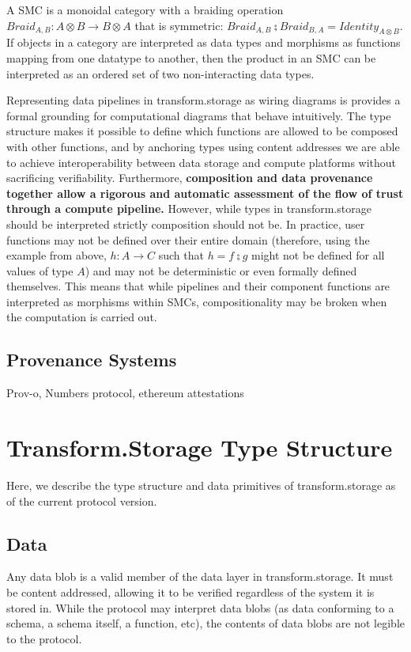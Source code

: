 \documentclass[9pt, oneside]{article}   	%
\begin{document}
\begin{multicols}{2}
A SMC is a monoidal category with a braiding operation $Braid_{A,B} : A \otimes B \rightarrow B \otimes A$ that is symmetric: $Braid_{A,B} \zcmp Braid_{B,A}=Identity_{A \otimes B}$. If objects in a category are interpreted as data types and morphisms as functions mapping from one datatype to another, then the product in an SMC can be interpreted as an ordered set of two non-interacting data types. 

Representing data pipelines in transform.storage as wiring diagrams is provides a formal grounding for computational diagrams that behave intuitively. The type structure makes it possible to define which functions are allowed to be composed with other functions, and by anchoring types using content addresses we are able to achieve interoperability between data storage and compute platforms without sacrificing verifiability. Furthermore, \textbf{composition and data provenance together allow a rigorous and automatic assessment of the flow of trust through a compute pipeline.}  However, while types in transform.storage should be interpreted strictly composition should not be. In practice, user functions may not be defined over their entire domain (therefore, using the example from above, $h : A \rightarrow C$ such that $h = f \zcmp g$ might not be defined for all values of type $A$) and may not be deterministic or even formally defined themselves. This means that while pipelines and their component functions are interpreted as morphisms within SMCs, compositionality may be broken when the computation is carried out. 


\subsection{Provenance Systems}\label{smc}
Prov-o, Numbers protocol, ethereum attestations 

\section{Transform.Storage Type Structure}\label{transformtypes}

Here, we describe the type structure and data primitives of transform.storage as of the current protocol version.

\subsection{Data}\label{data}

Any data blob is a valid member of the data layer in transform.storage. It must be content addressed, allowing it to be verified regardless of the system it is stored in. While the protocol may interpret data blobs (as data conforming to a schema, a schema itself, a function, etc), the contents of data blobs are not legible to the protocol.


\end{multicols}
\end{document}
